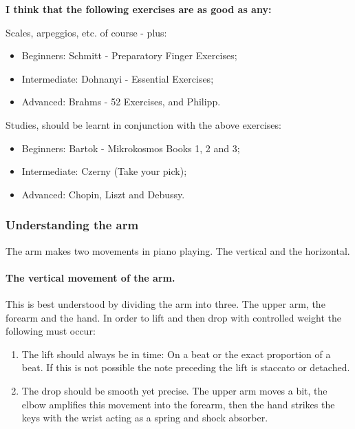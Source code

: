 \documentclass{article}
\begin{document}
\textbf{I think that the following exercises are as good as any:\footnotemark}


Scales, arpeggios, etc. of course - plus:\footnotemark


\begin{itemize}
    \item Beginners:    Schmitt - Preparatory Finger Exercises;
    \item Intermediate: Dohnanyi - Essential Exercises;
    \item Advanced:     Brahms - 52 Exercises, and Philipp.
\end{itemize}

Studies, should be learnt in conjunction with the above exercises:

\begin{itemize}
    \item Beginners: Bartok - Mikrokosmos Books 1, 2 and 3;
    \item Intermediate: Czerny (Take your pick);
    \item Advanced: Chopin, Liszt and Debussy.
\end{itemize}

\subsubsection{Understanding the arm}

The arm makes two movements in piano playing.
The vertical and the horizontal.

\paragraph{The vertical movement of the arm.\newline\newline}

This is best understood by dividing the arm into three.
The upper arm, the forearm and the hand.
In order to lift and then drop with controlled weight the following must occur:

\begin{enumerate}
    \item The lift should always be in time: On a beat or the exact proportion of a beat.
        If this is not possible the note preceding the lift is staccato or detached.
    \item The drop should be smooth yet precise.
        The upper arm moves a bit, the elbow amplifies this movement into the forearm, then the hand strikes the keys with the wrist acting as a spring and shock absorber.
\end{enumerate}
\end{document}
